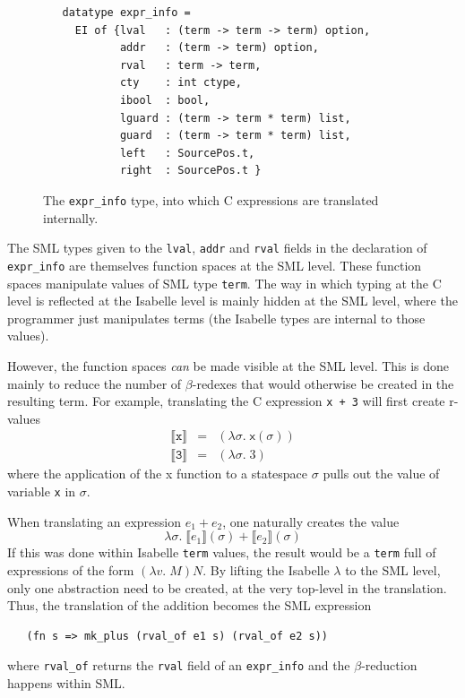 \documentclass{article}
\newcommand{\Sem}[1]{\ensuremath{\llbracket#1\rrbracket}}
\begin{document}
\begin{figure}
\begin{verbatim}
   datatype expr_info =
     EI of {lval   : (term -> term -> term) option,
            addr   : (term -> term) option,
            rval   : term -> term,
            cty    : int ctype,
            ibool  : bool,
            lguard : (term -> term * term) list,
            guard  : (term -> term * term) list,
            left   : SourcePos.t,
            right  : SourcePos.t }
\end{verbatim}
\caption{The \texttt{expr_info} type, into which C expressions are
  translated internally.}
\label{fig:exprinfo}
\end{figure}

The SML types given to the \texttt{lval}, \texttt{addr} and
\texttt{rval} fields in the declaration of \texttt{expr_info} are
themselves function spaces at the SML level.  These function spaces
manipulate values of SML type \texttt{term}.  The way in which typing
at the C level is reflected at the Isabelle level is mainly hidden at
the SML level, where the programmer just manipulates terms (the
Isabelle types are internal to those values).

However, the function spaces \emph{can} be made visible at the SML
level.  This is done mainly to reduce the number of $\beta$-redexes
that would otherwise be created in the resulting term.  For example,
translating the C expression \texttt{x~+~3} will first create r-values
\begin{eqnarray*}
\Sem{\texttt{x}} &=& (\lambda\sigma.\;\textsf{x}(\sigma))\\
\Sem{\texttt{3}} &=& (\lambda\sigma. \;3)
\end{eqnarray*}
where the application of the \textsf{x} function to a statespace
$\sigma$ pulls out the value of variable \texttt{x} in $\sigma$.

When translating an expression $e_1 + e_2$, one naturally creates the
value
\[
\lambda\sigma.\;\Sem{e_1}(\sigma) + \Sem{e_2}(\sigma)
\]
If this was done within Isabelle \texttt{term} values, the result
would be a \texttt{term} full of expressions of the form $(\lambda
v.\;M)N$.  By lifting the Isabelle $\lambda$ to the SML level, only
one abstraction need to be created, at the very top-level in the
translation.  Thus, the translation of the addition becomes the SML
expression
\begin{verbatim}
   (fn s => mk_plus (rval_of e1 s) (rval_of e2 s))
\end{verbatim}
where \texttt{rval_of} returns the \texttt{rval} field of an
\texttt{expr_info} and the $\beta$-reduction happens within SML.
\end{document}
